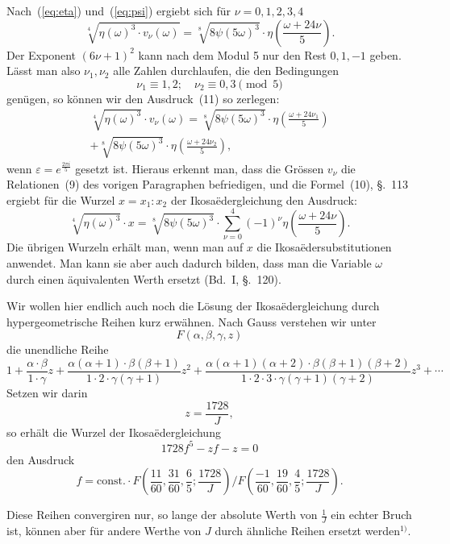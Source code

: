\documentclass[12pt,a4paper]{article}
\begin{document}
Nach~(\ref{eq:eta}) und~(\ref{eq:psi}) ergiebt sich f\"ur $\nu = 0, 1, 2, 3, 4$
\[
\sqrt[4]{\eta(\omega)^3 \cdot v_{\nu}(\omega)} = \sqrt[8]{8\psi(5\omega)^3} \cdot \eta\left(\frac{\omega + 24\nu}{5}\right).
\]
Der Exponent $(6\nu + 1)^2$ kann nach dem Modul 5 nur den Rest $0, 1, -1$ geben. L\"asst man also $\nu_1, \nu_2$ alle Zahlen durchlaufen, die den Bedingungen
\[
\nu_1 \equiv 1, 2; \quad \nu_2 \equiv 0, 3 \pmod{5}
\]
gen\"ugen, so k\"onnen wir den Ausdruck~(11) so zerlegen:
\begin{multline}
\label{eq:zerlegung} \sqrt[4]{\eta(\omega)^3} \cdot v_{\nu}(\omega) = \sqrt[8]{8\psi(5\omega)^3} \cdot \eta\left(\frac{\omega + 24\nu_1}{5}\right) \\
+ \sqrt[8]{8\psi(5\omega)^3} \cdot \eta\left(\frac{\omega + 24\nu_2}{5}\right),
\end{multline}
wenn $\varepsilon = e^{\frac{2\pi i}{5}}$ gesetzt ist. Hieraus erkennt man, dass die Gr\"ossen $v_{\nu}$ die Relationen~(9) des vorigen Paragraphen befriedigen, und die Formel~(10), \S.~113 ergiebt f\"ur die Wurzel $x = x_1:x_2$ der Ikosa\"edergleichung den Ausdruck:
\begin{equation}
\label{eq:wurzel} \sqrt[4]{\eta(\omega)^3} \cdot x = \sqrt[8]{8\psi(5\omega)^3} \cdot \sum_{\nu=0}^{4} (-1)^{\nu} \eta\left(\frac{\omega + 24\nu}{5}\right).
\end{equation}
Die \"ubrigen Wurzeln erh\"alt man, wenn man auf $x$ die Ikosa\"edersubstitutionen anwendet. Man kann sie aber auch dadurch bilden, dass man die Variable $\omega$ durch einen \"aquivalenten Werth ersetzt (Bd.~I, \S.~120).

Wir wollen hier endlich auch noch die L\"osung der Ikosa\"edergleichung durch hypergeometrische Reihen kurz erw\"ahnen. Nach Gauss verstehen wir unter
\[
F(\alpha, \beta, \gamma, z)
\]
die unendliche Reihe
\[
1 + \frac{\alpha \cdot \beta}{1 \cdot \gamma} z + \frac{\alpha(\alpha+1) \cdot \beta(\beta+1)}{1 \cdot 2 \cdot \gamma(\gamma+1)} z^2 + \frac{\alpha(\alpha+1)(\alpha+2) \cdot \beta(\beta+1)(\beta+2)}{1 \cdot 2 \cdot 3 \cdot \gamma(\gamma+1)(\gamma+2)} z^3 + \cdots
\]
Setzen wir darin
\[
z = \frac{1728}{J},
\]
so erh\"alt die Wurzel der Ikosa\"edergleichung
\[
1728f^5 - zf - z = 0
\]
den Ausdruck
\[
f = \text{const.} \cdot F\left(\frac{11}{60}, \frac{31}{60}, \frac{6}{5}; \frac{1728}{J}\right) \Big/ F\left(\frac{-1}{60}, \frac{19}{60}, \frac{4}{5}; \frac{1728}{J}\right).
\]

Diese Reihen convergiren nur, so lange der absolute Werth von $\frac{1}{J}$ ein echter Bruch ist, k\"onnen aber f\"ur andere Werthe von $J$ durch \"ahnliche Reihen ersetzt werden$^{1)}$.
\end{document}
